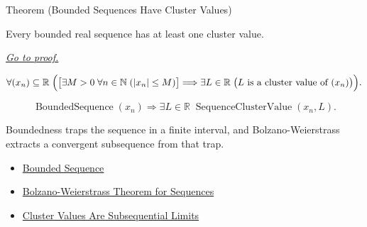 
\begin{theorembox}{Theorem (Bounded Sequences Have Cluster Values)}
\begin{theorem}
\label{thm:bounded-sequences-have-cluster-values}
Every bounded real sequence has at least one cluster value.

\smallskip
\noindent
\hyperref[prf:bounded-sequences-have-cluster-values]{\textit{Go to proof.}}
\end{theorem}
\end{theorembox}

\begin{remark*}
\[
\forall (x_n)\subseteq\mathbb{R}\;
\Bigl(
  \bigl[\exists M>0\;\forall n\in\mathbb{N}\;(|x_n|\le M)\bigr]
  \Longrightarrow
  \exists L\in\mathbb{R}\;
  \bigl(L\text{ is a cluster value of }(x_n)\bigr)
\Bigr).
\]
\end{remark*}

\begin{remark*}
\[
\operatorname{BoundedSequence}(x_n)
\Longrightarrow
\exists L\in\mathbb{R}\;\operatorname{SequenceClusterValue}(x_n,L).
\]
\end{remark*}

\begin{remark*}[Interpretation]
Boundedness traps the sequence in a finite interval, and
Bolzano-Weierstrass extracts a convergent subsequence from that trap.
\end{remark*}

\begin{dependencies}
\begin{itemize}
  \item \hyperref[def:bounded-sequence]{Bounded Sequence}
  \item \hyperref[thm:bolzano-weierstrass-sequences]{Bolzano-Weierstrass Theorem for Sequences}
  \item \hyperref[thm:cluster-values-are-subsequential-limits]{Cluster Values Are Subsequential Limits}
\end{itemize}
\end{dependencies}


